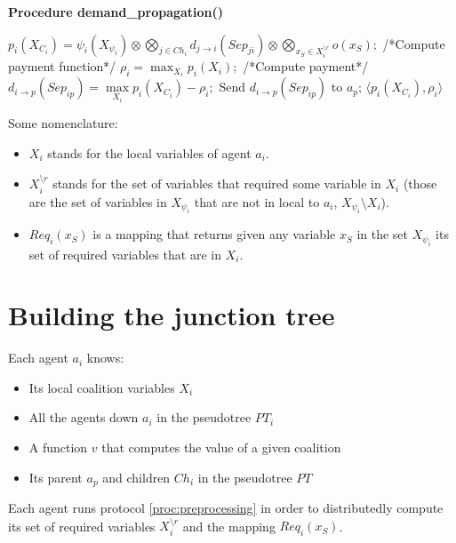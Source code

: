 \documentclass{article}
\begin{document}
\begin{algorithm}[!tb]
\caption{\textbf{Procedure demand\_propagation()}} 
 \begin{algorithmic}[1]
 \STATE $p_i(X_{C_i}) =  \psi_i(X_{\psi_i}) \otimes \bigotimes_{j \in Ch_i}
     d_{j \rightarrow i}(Sep_{ji})\otimes \bigotimes_{x_S \in X^{\setminus
     r}_i}o(x_S);$ /*Compute payment function*/ 
 \STATE $\rho_i = \max_{X_{i}} p_i(X_{i});$ /*Compute payment*/
    	\STATE $d_{i \rightarrow p}(Sep_{ip})= \max\limits_{X_i}
    	p_i(X_{C_i}) - \rho_i ;$ 
    	 \STATE Send $d_{i\rightarrow p}(Sep_{ip})$ to $a_p$;
  \ENDIF 
 \RETURN $\langle p_i(X_{C_i}), \rho_i \rangle$ 
  \end{algorithmic}
 \end{algorithm}




Some nomenclature:
\begin{itemize}
\item $X_i$ stands for the local variables of agent $a_i$.
\item $X^{\setminus r}_i$ stands for the set of variables that required some
variable in $X_i$ (those are the set of variables in $X_{\psi_i}$ that are not
in local to $a_i$, $X_{\psi_i} \setminus X_i$).
\item $Req_i(x_S)$ is a mapping that returns given any variable $x_S$ in the set
$X_{\psi_i}$ its set of required variables that are in $X_i$.
\end{itemize}

\section{Building the junction tree}

Each agent $a_i$ knows:
\begin{itemize}
  \item Its local coalition variables $X_i$
  \item All the agents down $a_i$ in the pseudotree $PT_i$
  \item A function $v$ that computes the value of a given coalition
  \item Its parent $a_p$ and children $Ch_i$ in the pseudotree $PT$
\end{itemize}

Each agent runs protocol \ref{proc:preprocessing} in order to distributedly
compute its set of required variables $X^{\setminus r}_i$ and the mapping $Req_i(x_S)$.
\end{document}
